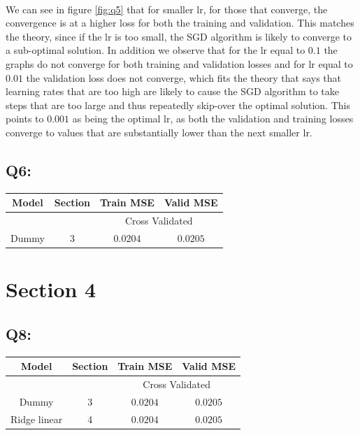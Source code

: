 \documentclass{article}
\begin{document}
    \paragraph*{}
    We can see in figure \ref{fig:q5} that for smaller lr, for those that converge, the convergence is at a higher loss for both the training and validation. This matches the theory, since if the lr is too small, the SGD algorithm is likely to converge to a sub-optimal solution. In addition we observe that for the lr equal to $0.1$ the graphs do not converge for both training and validation losses and for lr equal to $0.01$ the validation loss does not converge, which fits the theory that says that learning rates that are too high are likely to cause the SGD algorithm to take steps that are too large and thus repeatedly skip-over the optimal solution. This points to $0.001$ as being the optimal lr, as both the validation and training losses converge to values that are substantially lower than the next smaller lr.
\subsection*{Q6:}
    \begin{center}
        \begin{tabular}{|c|c|c|c|}
            \hline
            \rowcolor{gray!60}
            Model & Section & Train MSE & Valid MSE\\ \hline
            \rowcolor{gray!20}
            ~&~ & \multicolumn{2}{c|}{Cross Validated}\\ \hline
            Dummy & 3 & $0.0204$ & $0.0205$\\ \hline
        \end{tabular}
    \end{center}
\section*{Section 4}
\subsection*{Q8:}
    \begin{center}
        \begin{tabular}{|c|c|c|c|}
            \hline
            \rowcolor{gray!60}
            Model & Section & Train MSE & Valid MSE\\ \hline
            \rowcolor{gray!20}
            ~&~ & \multicolumn{2}{c|}{Cross Validated}\\ \hline
            Dummy & 3 & $0.0204$ & $0.0205$\\ \hline
            Ridge linear & 4 & $0.0204$ & $0.0205$\\ \hline
        \end{tabular}
    \end{center}
\end{document}
